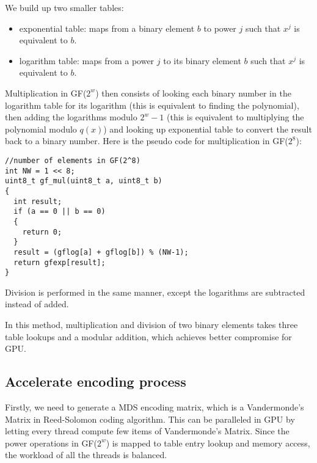 \documentclass[a4paper]{article}
\begin{document}
%

We build up two smaller tables:
\begin{itemize}
  \item exponential table: maps from a binary element $b$ to power $j$ such that $x^j$ is equivalent to $b$.
  \item logarithm table: maps from a power $j$ to its binary element $b$ such that $x^j$ is equivalent to $b$.
\end{itemize}
Multiplication in GF($2^w$) then consists of 
looking each binary number in the logarithm table for its logarithm (this is equivalent to finding the polynomial), 
then adding the logarithms modulo $2^w-1$ (this is equivalent to multiplying the polynomial modulo $q(x)$) 
and 
looking up exponential table to convert the result back to a binary number.
Here is the pseudo code for multiplication in GF($2^8$):
\begin{verbatim}
//number of elements in GF(2^8)
int NW = 1 << 8;
uint8_t gf_mul(uint8_t a, uint8_t b)
{
  int result;
  if (a == 0 || b == 0)
  {
    return 0;
  }
  result = (gflog[a] + gflog[b]) % (NW-1);
  return gfexp[result];
}
\end{verbatim}
Division is performed in the same manner, except the logarithms are subtracted instead of added.

In this method, multiplication and division of two binary elements takes three table lookups and a modular addition,
which achieves better compromise for GPU.

\subsection{Accelerate encoding process}

Firstly, we need to generate a MDS encoding matrix,
which is a Vandermonde's Matrix in Reed-Solomon coding algorithm.
%
This can be paralleled in GPU by letting every thread compute few items of Vandermonde's Matrix.
Since the power operations in GF($2^w$) is mapped to
table entry lookup and memory access,
the workload of all the threads is balanced.
\end{document}
